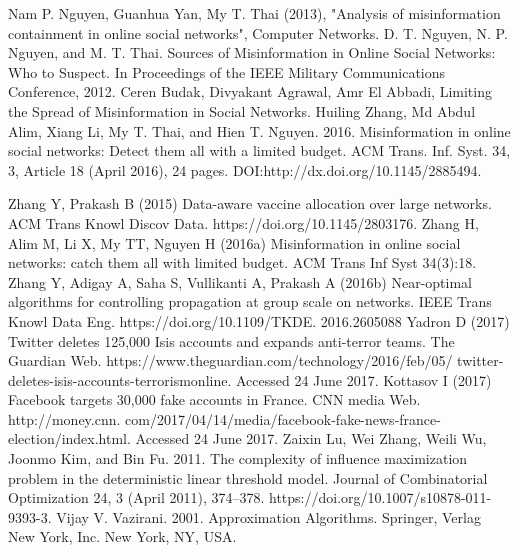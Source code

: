 \begin{thebibliography}{4}
	 Nam P. Nguyen, Guanhua Yan, My T. Thai (2013), "Analysis of misinformation containment in online social networks", Computer Networks.
	 D. T. Nguyen, N. P. Nguyen, and M. T. Thai. Sources of Misinformation in Online Social Networks: Who to Suspect. In Proceedings of the IEEE Military Communications Conference, 2012.
	 Ceren Budak, Divyakant Agrawal, Amr El Abbadi, Limiting the Spread of Misinformation in Social Networks.
	 Huiling Zhang, Md Abdul Alim, Xiang Li, My T. Thai, and Hien T. Nguyen. 2016. Misinformation in online social networks: Detect them all with a limited budget. ACM Trans. Inf. Syst. 34, 3, Article 18 (April 2016), 24 pages. DOI:http://dx.doi.org/10.1145/2885494.
	
	 Zhang Y, Prakash B (2015) Data-aware vaccine allocation over large networks. ACM Trans Knowl Discov Data. https://doi.org/10.1145/2803176.
	 Zhang H, Alim M, Li X, My TT, Nguyen H (2016a) Misinformation in online social networks: catch them all with limited budget. ACM Trans Inf Syst 34(3):18.
	 Zhang Y, Adigay A, Saha S, Vullikanti A, Prakash A (2016b) Near-optimal algorithms for controlling propagation at group scale on networks. IEEE Trans Knowl Data Eng. https://doi.org/10.1109/TKDE. 2016.2605088
	 Yadron D (2017) Twitter deletes 125,000 Isis accounts and expands anti-terror teams. The Guardian Web. https://www.theguardian.com/technology/2016/feb/05/ twitter-deletes-isis-accounts-terrorismonline. Accessed 24 June 2017.
	  Kottasov I (2017) Facebook targets 30,000 fake accounts in France. CNN media Web. http://money.cnn. com/2017/04/14/media/facebook-fake-news-france-election/index.html. Accessed 24 June 2017.
	 Zaixin Lu, Wei Zhang, Weili Wu, Joonmo Kim, and Bin Fu. 2011. The complexity of influence maximization problem in the deterministic linear threshold model. Journal of Combinatorial Optimization 24, 3 (April 2011), 374–378. https://doi.org/10.1007/s10878-011-9393-3. 
	 Vijay V. Vazirani. 2001. Approximation Algorithms. Springer, Verlag New York, Inc. New York, NY, USA.
\end{thebibliography}